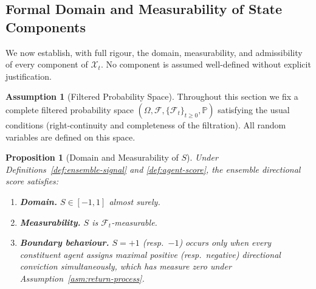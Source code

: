 \documentclass[12pt,openany]{book}
\newcommand{\calF}{\mathcal{F}}
\newcommand{\calX}{\mathcal{X}}
\newcommand{\Prob}{\mathbb{P}}
\numberwithin{equation}{chapter}
\theoremstyle{plain}
\newtheorem{proposition}[theorem]{Proposition}
\theoremstyle{definition}
\newtheorem{assumption}[theorem]{Assumption}
\theoremstyle{remark}
\numberwithin{equation}{chapter}
\theoremstyle{plain}
\begin{document}
\subsection{Formal Domain and Measurability of State Components}

\noindent
We now establish, with full rigour, the domain, measurability, and
admissibility of every component of $\calX_t$.  No component is
assumed well-defined without explicit justification.

\begin{assumption}[Filtered Probability Space]
\label{asm:filtered-space}
Throughout this section we fix a complete filtered probability space
$(\Omega,\calF,\{\calF_t\}_{t\geq 0},\Prob)$ satisfying the usual
conditions (right-continuity and completeness of the filtration).
All random variables are defined on this space.
\end{assumption}

\begin{proposition}[Domain and Measurability of $S$]
\label{prop:S-domain}
Under Definitions~\ref{def:ensemble-signal} and
\ref{def:agent-score}, the ensemble directional score satisfies:
\begin{enumerate}
  \item \textbf{Domain.} $S \in [-1,1]$ almost surely.
  \item \textbf{Measurability.} $S$ is $\calF_t$-measurable.
  \item \textbf{Boundary behaviour.}
    $S = +1$ (resp.\ $-1$) occurs only when every constituent agent
    assigns maximal positive (resp.\ negative) directional conviction
    simultaneously, which has measure zero under Assumption~\ref{asm:return-process}.
\end{enumerate}
\end{proposition}
\end{document}
